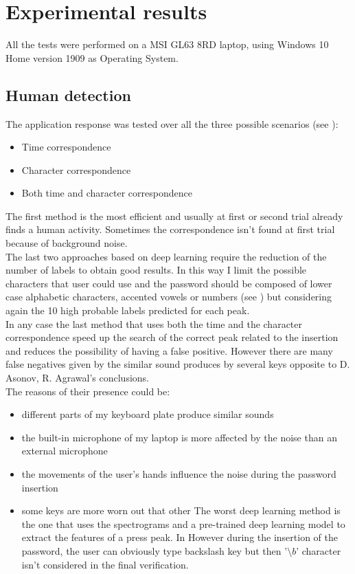 \chapter{Experimental results}\label{chapter:Results}
All the tests were performed on a MSI GL63 8RD laptop, using Windows 10 Home version 1909 as Operating System.

\section{Human detection}
The application response was tested over all the three possible scenarios (see ): 
\begin{itemize}
\item{Time correspondence}
\item{Character correspondence}
\item{Both time and character correspondence}
\end{itemize}
The first method is the most efficient and usually at first or second trial already finds a human activity. Sometimes the correspondence isn't found at first trial because of background noise. \\
The last two approaches based on deep learning require the reduction of the number of labels to obtain good results. In this way I limit the possible characters that user could use and the password should be composed of lower case alphabetic characters, accented vowels or numbers (see ) but considering again the 10 high probable labels predicted for each peak.\\
In any case the last method that uses both the time and the character correspondence speed up the search of the correct peak related to the insertion and reduces the possibility of having a false positive. However there are many false negatives given by the similar sound produces by several keys opposite to D. Asonov, R. Agrawal's conclusions\cite{keyboard_acoustic}.\\
The reasons of their presence could be:
\begin{itemize}
\item{different parts of my keyboard plate produce similar sounds}
\item{the built-in microphone of my laptop is more affected by the noise than an external microphone}
\item{the movements of the user's hands influence the noise during the password insertion}
\item{some keys are more worn out that other}
The worst deep learning method is the one that uses the spectrograms and a pre-trained deep learning model to extract the features of a press peak. In 
However during the insertion of the password, the user can obviously type backslash key but then '$\setminus b$' character isn't considered in the final verification.\\

\end{itemize}
